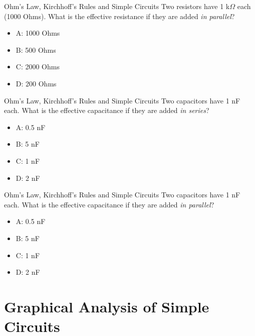 \documentclass{beamer}
\begin{document}
\begin{frame}{Ohm's Law, Kirchhoff's Rules and Simple Circuits}
Two resistors have 1 k$\Omega$ each (1000 Ohms).  What is the effective resistance if they are added \textit{in parallel}?
\begin{itemize}
\item A: 1000 Ohms
\item B: 500 Ohms
\item C: 2000 Ohms
\item D: 200 Ohms
\end{itemize}
\end{frame}

\begin{frame}{Ohm's Law, Kirchhoff's Rules and Simple Circuits}
Two capacitors have 1 nF each.  What is the effective capacitance if they are added \textit{in series}?
\begin{itemize}
\item A: 0.5 nF
\item B: 5 nF
\item C: 1 nF
\item D: 2 nF
\end{itemize}
\end{frame}

\begin{frame}{Ohm's Law, Kirchhoff's Rules and Simple Circuits}
Two capacitors have 1 nF each.  What is the effective capacitance if they are added \textit{in parallel}?
\begin{itemize}
\item A: 0.5 nF
\item B: 5 nF
\item C: 1 nF
\item D: 2 nF
\end{itemize}
\end{frame}

\section{Graphical Analysis of Simple Circuits}
\end{document}
